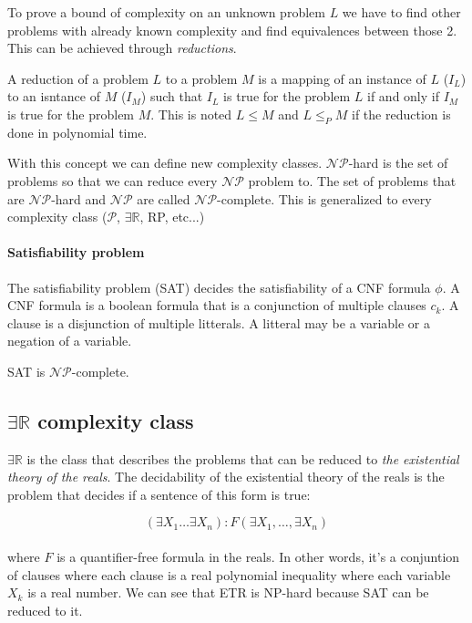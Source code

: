 To prove a bound of complexity on an unknown problem $L$ we have to find other
problems with already known complexity and find equivalences between those 2. This
can be achieved through \textit{reductions}.

\begin{defn}
  A reduction of a problem $L$ to a problem $M$ is a mapping of an instance of $L$ ($I_L$)
  to an isntance of $M$ ($I_M$) such that $I_L$ is true for the problem $L$ if and
  only if $I_M$ is true for the problem $M$. This is noted $L \leq M$ and $L \leq_P M$
  if the reduction is done in polynomial time.
\end{defn}

With this concept we can define new complexity classes. $\mathcal{NP}$-hard is
the set of problems so that we can reduce every $\mathcal{NP}$ problem to. The set
of problems that are $\mathcal{NP}$-hard and $\mathcal{NP}$ are called $\mathcal{NP}$-complete.
This is generalized to every complexity class ($\mathcal{P}$, $\exists \mathbb{R}$, RP, etc...)

\paragraph{Satisfiability problem} The satisfiability problem (SAT) decides the satisfiability
of a CNF formula $\phi$. A CNF formula is a boolean formula that is a conjunction of multiple
clauses $c_k$. A clause is a disjunction of multiple litterals. A litteral may be a variable
or a negation of a variable.

\begin{theorem}
  SAT is $\mathcal{NP}$-complete.
\end{theorem}

\subsection{$\exists \mathbb{R}$ complexity class}

$\exists \mathbb{R}$ is the class that describes the problems that can be reduced to \textit{the existential theory of the reals}\cite{ExistentialTheoryReals2006}. The decidability of the existential theory of the reals is the problem that decides if a sentence of this form is true:

$$(\exists X_1 \dots \exists X_n): F(\exists X_1, \dots,\exists X_n)$$\\

where $F$ is a quantifier-free formula in the reals. In other words, it's a
conjuntion of clauses where each clause is a real polynomial inequality where
each variable $X_k$ is a real number. We can see that ETR is NP-hard because
SAT can be reduced to it.


